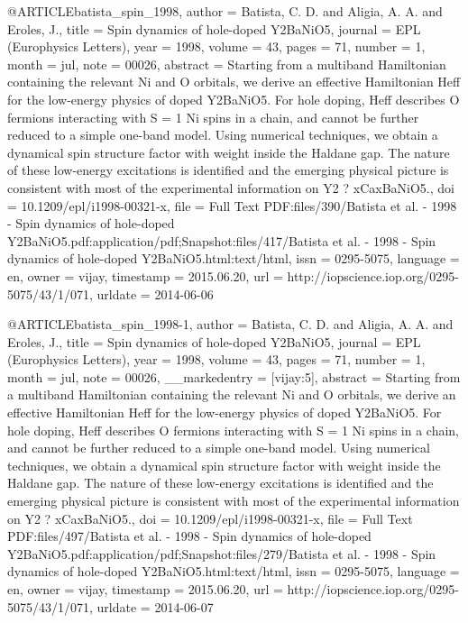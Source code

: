 @ARTICLE{batista_spin_1998,
  author = {Batista, C. D. and Aligia, A. A. and Eroles, J.},
  title = {Spin dynamics of hole-doped {Y}2BaNiO5},
  journal = {EPL (Europhysics Letters)},
  year = {1998},
  volume = {43},
  pages = {71},
  number = {1},
  month = jul,
  note = {00026},
  abstract = {Starting from a multiband Hamiltonian containing the relevant Ni and
	O orbitals, we derive an effective Hamiltonian Heff for the low-energy
	physics of doped Y2BaNiO5. For hole doping, Heff describes O fermions
	interacting with S = 1 Ni spins in a chain, and cannot be further
	reduced to a simple one-band model. Using numerical techniques, we
	obtain a dynamical spin structure factor with weight inside the Haldane
	gap. The nature of these low-energy excitations is identified and
	the emerging physical picture is consistent with most of the experimental
	information on Y2 ? xCaxBaNiO5.},
  doi = {10.1209/epl/i1998-00321-x},
  file = {Full Text PDF:files/390/Batista et al. - 1998 - Spin dynamics of hole-doped Y2BaNiO5.pdf:application/pdf;Snapshot:files/417/Batista et al. - 1998 - Spin dynamics of hole-doped Y2BaNiO5.html:text/html},
  issn = {0295-5075},
  language = {en},
  owner = {vijay},
  timestamp = {2015.06.20},
  url = {http://iopscience.iop.org/0295-5075/43/1/071},
  urldate = {2014-06-06}
}

@ARTICLE{batista_spin_1998-1,
  author = {Batista, C. D. and Aligia, A. A. and Eroles, J.},
  title = {Spin dynamics of hole-doped {Y}2BaNiO5},
  journal = {EPL (Europhysics Letters)},
  year = {1998},
  volume = {43},
  pages = {71},
  number = {1},
  month = jul,
  note = {00026},
  __markedentry = {[vijay:5]},
  abstract = {Starting from a multiband Hamiltonian containing the relevant Ni and
	O orbitals, we derive an effective Hamiltonian Heff for the low-energy
	physics of doped Y2BaNiO5. For hole doping, Heff describes O fermions
	interacting with S = 1 Ni spins in a chain, and cannot be further
	reduced to a simple one-band model. Using numerical techniques, we
	obtain a dynamical spin structure factor with weight inside the Haldane
	gap. The nature of these low-energy excitations is identified and
	the emerging physical picture is consistent with most of the experimental
	information on Y2 ? xCaxBaNiO5.},
  doi = {10.1209/epl/i1998-00321-x},
  file = {Full Text PDF:files/497/Batista et al. - 1998 - Spin dynamics of hole-doped Y2BaNiO5.pdf:application/pdf;Snapshot:files/279/Batista et al. - 1998 - Spin dynamics of hole-doped Y2BaNiO5.html:text/html},
  issn = {0295-5075},
  language = {en},
  owner = {vijay},
  timestamp = {2015.06.20},
  url = {http://iopscience.iop.org/0295-5075/43/1/071},
  urldate = {2014-06-07}
}

